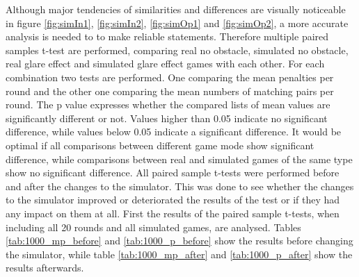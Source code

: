 Although major tendencies of similarities and differences are visually noticeable in figure \ref{fig:simIn1}, \ref{fig:simIn2}, \ref{fig:simOp1} and \ref{fig:simOp2}, a more accurate analysis is needed to to make reliable statements. Therefore multiple paired samples t-test are performed, comparing real no obstacle, simulated no obstacle, real glare effect and simulated glare effect games with each other. For each combination two tests are performed. One comparing the mean penalties per round and the other one comparing the mean numbers of matching pairs per round. The p value expresses whether the compared lists of mean values are significantly different or not. Values higher than 0.05 indicate no significant difference, while values below 0.05 indicate a significant difference. It would be optimal if all comparisons between different game mode show significant difference, while comparisons between real and simulated games of the same type show no significant difference. All paired sample t-tests were performed before and after the changes to the simulator. This was done to see whether the changes to the simulator improved or deteriorated the results of the test or if they had any impact on them at all. First the results of the paired sample t-tests, when including all 20 rounds and all simulated games, are analysed. Tables \ref{tab:1000_mp_before} and \ref{tab:1000_p_before} show the results before changing the simulator, while table \ref{tab:1000_mp_after} and \ref{tab:1000_p_after} show the results afterwards.

\newpage

